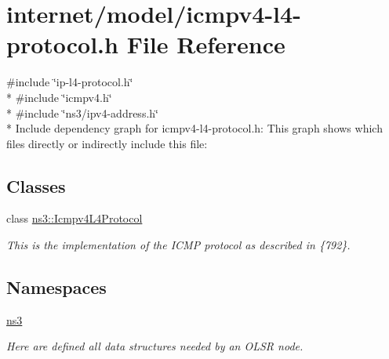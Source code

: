 \hypertarget{icmpv4-l4-protocol_8h}{}\section{internet/model/icmpv4-\/l4-\/protocol.h File Reference}
\label{icmpv4-l4-protocol_8h}
{\ttfamily \#include \char`\"{}ip-\/l4-\/protocol.\+h\char`\"{}}\\*
{\ttfamily \#include \char`\"{}icmpv4.\+h\char`\"{}}\\*
{\ttfamily \#include \char`\"{}ns3/ipv4-\/address.\+h\char`\"{}}\\*
Include dependency graph for icmpv4-\/l4-\/protocol.h\+:
This graph shows which files directly or indirectly include this file\+:
\subsection*{Classes}
\begin{DoxyCompactItemize}
\item 
class \hyperlink{classns3_1_1Icmpv4L4Protocol}{ns3\+::\+Icmpv4\+L4\+Protocol}
\begin{DoxyCompactList}\small\item\em This is the implementation of the I\+C\+MP protocol as described in \{792\}. \end{DoxyCompactList}\end{DoxyCompactItemize}
\subsection*{Namespaces}
\begin{DoxyCompactItemize}
\item 
 \hyperlink{namespacens3}{ns3}
\begin{DoxyCompactList}\small\item\em Here are defined all data structures needed by an O\+L\+SR node. \end{DoxyCompactList}\end{DoxyCompactItemize}
